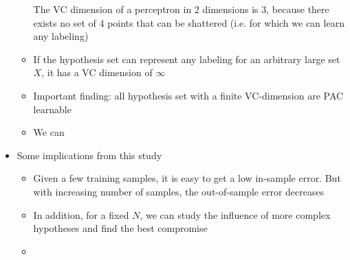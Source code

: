 \begin{itemize}
\begin{itemize}
		The VC dimension of a perceptron in 2 dimensions is $3$, because there exists no set of 4 points that can be shattered (i.e. for which we can learn any labeling)
		\item If the hypothesis set can represent any labeling for an arbitrary large set $X$, it has a VC dimension of $\infty$
		\item Important finding: all hypothesis set with a finite VC-dimension are PAC learnable
		\item We can 
	\end{itemize}
	\item Some implications from this study
	\begin{itemize}
		\item Given a few training samples, it is easy to get a low in-sample error. But with increasing number of samples, the out-of-sample error decreases
		\item In addition, for a fixed $N$, we can study the influence of more complex hypotheses and find the best compromise
		\item  
	\end{itemize}
\end{itemize}